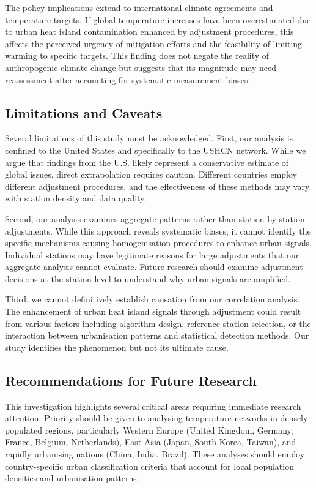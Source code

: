 \documentclass[11pt, a4paper]{article}
\begin{document}
The policy implications extend to international climate agreements and temperature targets. If global temperature increases have been overestimated due to urban heat island contamination enhanced by adjustment procedures, this affects the perceived urgency of mitigation efforts and the feasibility of limiting warming to specific targets. This finding does not negate the reality of anthropogenic climate change but suggests that its magnitude may need reassessment after accounting for systematic measurement biases.

\subsection{Limitations and Caveats}

Several limitations of this study must be acknowledged. First, our analysis is confined to the United States and specifically to the USHCN network. While we argue that findings from the U.S. likely represent a conservative estimate of global issues, direct extrapolation requires caution. Different countries employ different adjustment procedures, and the effectiveness of these methods may vary with station density and data quality.

Second, our analysis examines aggregate patterns rather than station-by-station adjustments. While this approach reveals systematic biases, it cannot identify the specific mechanisms causing homogenisation procedures to enhance urban signals. Individual stations may have legitimate reasons for large adjustments that our aggregate analysis cannot evaluate. Future research should examine adjustment decisions at the station level to understand why urban signals are amplified.

Third, we cannot definitively establish causation from our correlation analysis. The enhancement of urban heat island signals through adjustment could result from various factors including algorithm design, reference station selection, or the interaction between urbanisation patterns and statistical detection methods. Our study identifies the phenomenon but not its ultimate cause.

\subsection{Recommendations for Future Research}

This investigation highlights several critical areas requiring immediate research attention. Priority should be given to analysing temperature networks in densely populated regions, particularly Western Europe (United Kingdom, Germany, France, Belgium, Netherlands), East Asia (Japan, South Korea, Taiwan), and rapidly urbanising nations (China, India, Brazil). These analyses should employ country-specific urban classification criteria that account for local population densities and urbanisation patterns.
\end{document}
